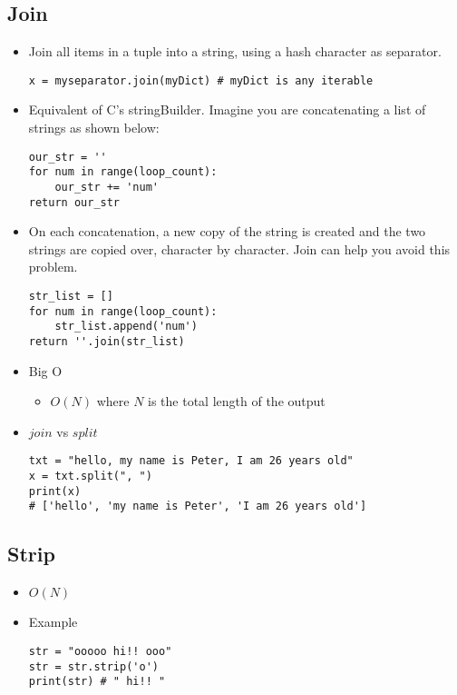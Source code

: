 \documentclass[a4paper, 11.25pt]{article}
\begin{document}
\subsection{Join}
\begin{itemize}
    \item Join all items in a tuple into a string, using a hash character as separator.
    \begin{lstlisting}[style=PythonStyle]
x = myseparator.join(myDict) # myDict is any iterable\end{lstlisting}
    \item Equivalent of C's stringBuilder. Imagine you are concatenating a list of strings as shown below:
    \begin{lstlisting}[style=PythonStyle]
our_str = ''
for num in range(loop_count):
    our_str += 'num'
return our_str\end{lstlisting}
    \item On each concatenation, a new copy of the string is created and the two strings are copied over, character by character. Join can help you avoid this problem. 
    \begin{lstlisting}[style=PythonStyle]
str_list = []
for num in range(loop_count):
    str_list.append('num')
return ''.join(str_list)\end{lstlisting}
    \item Big O
    \begin{itemize}
        \item $O(N)$ where $N$ is the total length of the output
    \end{itemize}
    \item $join$ vs $split$
    \begin{lstlisting}[style=PythonStyle]
txt = "hello, my name is Peter, I am 26 years old"
x = txt.split(", ")
print(x)
# ['hello', 'my name is Peter', 'I am 26 years old']\end{lstlisting}
\end{itemize}

\subsection{Strip}
\begin{itemize}
    \item $O(N)$
    \item Example
    \begin{lstlisting}[style=PythonStyle]
str = "ooooo hi!! ooo"
str = str.strip('o')
print(str) # " hi!! "\end{lstlisting}
\end{itemize}
\end{document}
